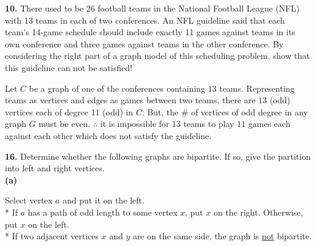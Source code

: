 \documentclass[12pt, letterpaper]{article}
\begin{document}
\textbf{10.} There used to be 26 football teams in the National Football League (NFL) with 13 teams in each of two conferences. An NFL guideline said that each team's 14-game schedule should include exactly 11 games against teams in its own conference and three games against teams in the other conference. By considering the right part of a graph model of this scheduling problem, show that this guideline can not be satisfied! 
\begin{center}
    \begin{framed}
        Let $C$ be a graph of one of the conferences containing $13$ teams. Representing teams as vertices and edges as games between two teams, there are $13$ (odd) vertices each of degree 11 (odd) in $C$. But, the \# of vertices of odd degree in any graph $G$ must be even. $\therefore$ it is impossible for $13$ teams to play $11$ games each against each other which does not satisfy the guideline.
    \end{framed}
\end{center}

\textbf{16.} Determine whether the following graphs are bipartite. If so, give the partition into left and right vertices. \\
\indent{} \textbf{(a)} 
\begin{center}
\end{center}
\begin{center}
Select vertex $a$ and put it on the left.  \\
* If $a$ has a path of odd length to some vertex $x$, put $x$ on the right. Otherwise, put $x$ on the left. \\
* If two adjacent vertices $x$ and $y$ are on the same side, the graph is \underline{not} bipartite.
\end{center}
\end{document}
